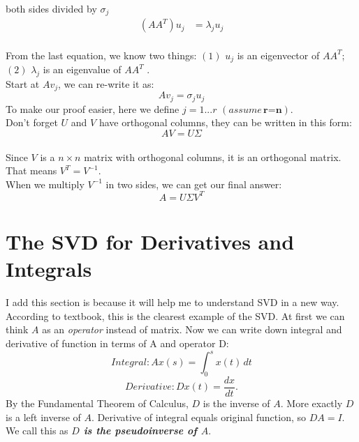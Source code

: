 \documentclass{article}
\begin{document}
\\
both sides divided by $\sigma_j$
\begin{align*}
	(AA^T)u_j  &= \lambda_j  u_j
\end{align*}
\\
From the last equation, we know two things: $(1)$ $u_j$ is an eigenvector of $AA^T$; $(2)$ $\lambda_j$ is an eigenvalue of $AA^T$ .
\\
Start at $Av_j$, we can re-write it as:
\begin{equation}
	Av_j = \sigma_j u _j
\end{equation}
To make our proof easier, here we define $j = 1 ... r$ $(assume \, \textbf{r=n})$.
\\
Don't forget $U$ and $V$ have orthogonal columns, they can be written in this form:
\begin{equation}
	AV = U \Sigma
\end{equation}
\\
Since $V$ is a $n \times n$ matrix with orthogonal columns, it is an orthogonal  matrix. That means $V^T = V^{-1}$.
\\
When we multiply $V^{-1}$ in two sides, we can get our final answer:
\begin{equation}
	A = U \Sigma V^T 
\end{equation} 

\newpage
\section{The SVD for Derivatives and Integrals}
I add this section is because it will help me to understand SVD in a new way. According to textbook,  this is the clearest example of the SVD. At first we can think $A$ as an \textit{operator} instead of matrix. Now we can write down integral and derivative of function in terms of A and operator D:
\[ Integral: Ax(s) = \int_{0}^{s} x(t) \,dt\] 
\[Derivative: Dx(t) = \frac{dx}{dt}.\]
By the Fundamental Theorem of Calculus, $D$ is the inverse of $A$. More exactly $D$ is a left inverse of $A$. Derivative of integral equals original function, so $DA = I$. We call this as \textbf{\textit{$D$ is the pseudoinverse of $A$}}.
\end{document}
